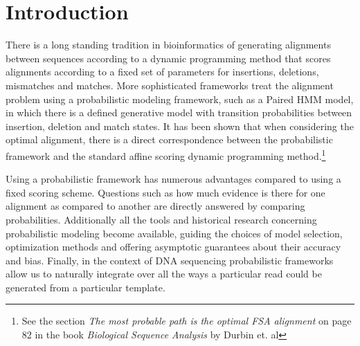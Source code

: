 \documentclass[fleqn,10pt]{SelfArx} %
\begin{document}
\flushbottom %

\maketitle %

\tableofcontents %

\thispagestyle{empty} %


\section{Introduction} %


There is a long standing tradition in bioinformatics of generating alignments between sequences according to a dynamic programming method that scores alignments according to a fixed set of parameters for insertions, deletions, mismatches and matches.  More sophisticated frameworks treat the alignment problem using a probabilistic modeling framework, such as a Paired HMM model, in which there is a defined generative model with transition probabilities between insertion, deletion and match states.  It has been shown that when considering the optimal alignment, there is a direct correspondence between the probabilistic framework and the standard affine scoring dynamic programming method.\footnote{See the section \textit{The most probable path is the optimal FSA alignment} on page 82 in the book \textit{Biological Sequence Analysis} by Durbin et. al}

Using a probabilistic framework has numerous advantages compared to using a fixed scoring scheme.  Questions such as how much evidence is there for one alignment as compared to another are directly answered by comparing probabilities.  Additionally all the tools and historical research concerning probabilistic modeling become available, guiding the choices of model selection, optimization methods and offering asymptotic guarantees about their accuracy and bias.  Finally, in the context of DNA sequencing probabilistic frameworks allow us to naturally integrate over all the ways a particular read could be generated from a particular template.
\end{document}
